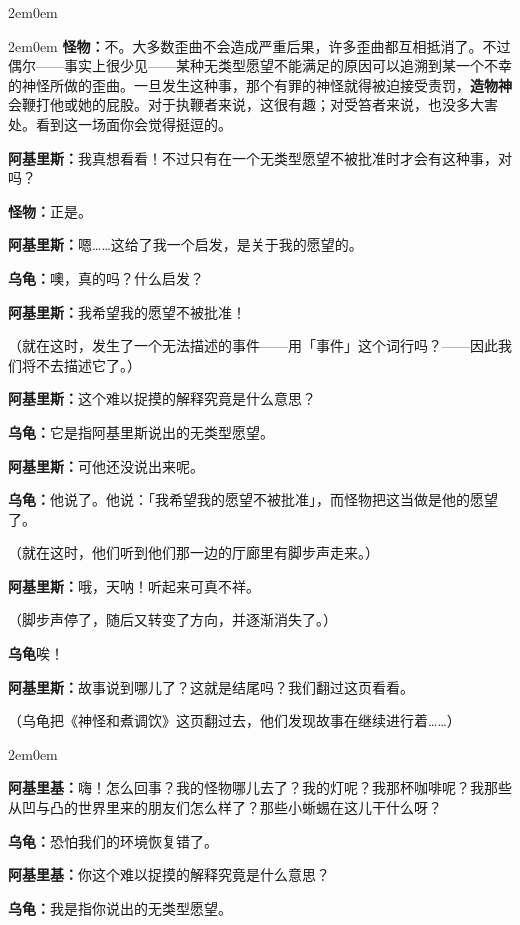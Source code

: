\documentclass[
  12pt,
  twoside,
  openright,
  oldfontcommands,
]{memoir}
\newcommand{\heititext}[1]{{\heifamily\bfseries #1}}
\newcommand{\dialogname}[1]{{\heifamily\bfseries #1}}
\begin{document}
\begin{adjustwidth}{2em}{0em}
\begin{adjustwidth}{2em}{0em}
\dialogname{怪物：}不。大多数歪曲不会造成严重后果，许多歪曲都互相抵消了。不过偶尔------事实上很少见------某种无类型愿望不能满足的原因可以追溯到某一个不幸的神怪所做的歪曲。一旦发生这种事，那个有罪的神怪就得被迫接受责罚，\heititext{造物神}会鞭打他或她的屁股。对于执鞭者来说，这很有趣；对受笞者来说，也没多大害处。看到这一场面你会觉得挺逗的。

\dialogname{阿基里斯：}我真想看看！不过只有在一个无类型愿望不被批准时才会有这种事，对吗？

\dialogname{怪物：}正是。

\dialogname{阿基里斯：}嗯\ldots\ldots 这给了我一个启发，是关于我的愿望的。

\dialogname{乌龟：}噢，真的吗？什么启发？

\dialogname{阿基里斯：}我希望我的愿望不被批准！

（就在这时，发生了一个无法描述的事件------用「事件」这个词行吗？------因此我们将不去描述它了。）

\end{adjustwidth}

\dialogname{阿基里斯：}这个难以捉摸的解释究竟是什么意思？

\dialogname{乌龟：}它是指阿基里斯说出的无类型愿望。

\dialogname{阿基里斯：}可他还没说出来呢。

\dialogname{乌龟：}他说了。他说：「我希望我的愿望不被批准」，而怪物把这当做是他的愿望了。

（就在这时，他们听到他们那一边的厅廊里有脚步声走来。）

\dialogname{阿基里斯：}哦，天呐！听起来可真不祥。

（脚步声停了，随后又转变了方向，并逐渐消失了。）

\dialogname{乌龟}唉！

\dialogname{阿基里斯：}故事说到哪儿了？这就是结尾吗？我们翻过这页看看。

（乌龟把《神怪和煮调饮》这页翻过去，他们发现故事在继续进行着\ldots\ldots）

\begin{adjustwidth}{2em}{0em}

\dialogname{阿基里基：}嗨！怎么回事？我的怪物哪儿去了？我的灯呢？我那杯咖啡呢？我那些从凹与凸的世界里来的朋友们怎么样了？那些小蜥蜴在这儿干什么呀？

\dialogname{乌龟：}恐怕我们的环境恢复错了。

\dialogname{阿基里基：}你这个难以捉摸的解释究竟是什么意思？

\dialogname{乌龟：}我是指你说出的无类型愿望。


\end{adjustwidth}
\end{adjustwidth}
\end{document}
